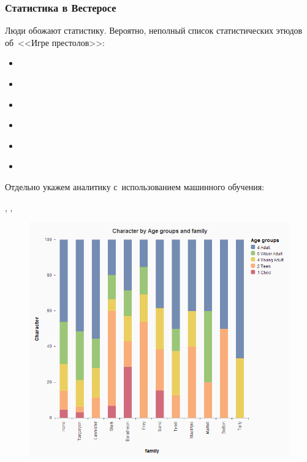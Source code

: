 \documentclass{beamer}
\begin{document}

\begin{frame}
\frametitle{Статистика в Вестеросе}
\begin{block}{}
Люди обожают статистику. Вероятно, неполный список статистических этюдов об~<<Игре престолов>>:
\end{block}

\begin{itemize}
\item \cite{p1}
\item \cite{p9}
\item \cite{p2}
\item \cite{p7}
\item \cite{p8}
\item \cite{p3}
\end{itemize}

\begin{block}{}
Отдельно укажем аналитику с~использованием машинного обучения:
\end{block}

\cite{p4}, \cite{p5}, \cite{p11}

\end{frame}


\begin{frame}
\begin{figure}
\includegraphics[width=0.7\linewidth]{diagr_age}
\end{figure}
\cite{p3}
\end{frame}
\end{document}
